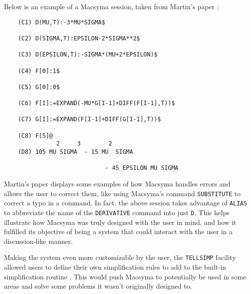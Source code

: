 Below is an example of a Macsyma session, taken from Martin's paper \parencite{martin1971macsyma}:

\begin{verbatim}
    (C1) D(MU,T):-3*MU*SIGMA$
    
    (C2) D(SIGMA,T):EPSILON-2*SIGMA**2$

    (C3) D(EPSILON,T):-SIGMA*(MU+2*EPSILON)$

    (C4) F[0]:1$

    (C5) G[0]:0$

    (C6) F[I]:=EXPAND(-MU*G[I-1]+DIFF(F[I-1],T))$

    (C7) G[I]:=EXPAND(F[I-1]+DIFF(G[I-1],T))$

    (C8) F[5]@
               2     3        2
    (D8) 105 MU SIGMA  - 15 MU  SIGMA

                             - 45 EPSILON MU SIGMA
\end{verbatim}

Martin's paper displays some examples of how Macsyma handles errors and allows the user to correct them, like using Macsyma's command \verb|SUBSTITUTE| to correct a typo in a command. In fact, the above session takes advantage of \verb|ALIAS| to abbreviate the name of the \verb|DERIVATIVE| command into just \verb|D|. This helps illustrate how Macsyma was truly designed with the user in mind, and how it fulfilled its objective of being a system that could interact with the user in a discussion-like manner.

Making the system even more customizable by the user, the \verb|TELLSIMP| facility allowed users to define their own simplification rules to add to the built-in simplification routine \parencite{martin1971macsyma}. This would push Macsyma to potentially be used in some areas and solve some problems it wasn't originally designed to.
